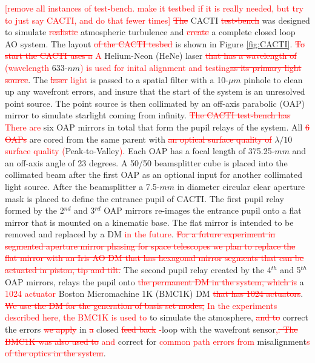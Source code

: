 \documentclass[12pt]{spieman}  %
\newcommand{\jrmadd}[1]{\textcolor{red}{#1}}
\newcommand{\jrmrmv}[1]{\textcolor{red}{\sout{#1}}}
\newcommand{\jrmcom}[1]{\textcolor{red}{[#1]}}
\begin{document}
\begin{spacing}{2}
\jrmcom{remove all instances of test-bench.  make it testbed if it is really needed, but try to just say CACTI, and do that fewer times}
\jrmrmv{The} CACTI \jrmrmv{test-bench} was designed to simulate \jrmrmv{realistic} atmospheric turbulence and \jrmrmv{create} a complete closed loop AO system. The layout \jrmrmv{of the CACTI tesbed} is shown in Figure \ref{fig:CACTI}. \jrmrmv{To start the CACTI uses a} \jrmadd{A} Helium-Neon (HeNe) laser \jrmrmv{that has a wavelength of} \jrmadd{(wavelength }633-$nm$\jrmadd{)} \jrmadd{is used for inital alignment and testing}\jrmrmv{as its primary light source}.  The \jrmrmv{laser} \jrmadd{light} is passed to a spatial filter with a 10-$\mu m$ pinhole to clean up any wavefront errors, and insure that the start of the system is an unresolved point source. The point source is then collimated by an off-axis parabolic (OAP) mirror to simulate starlight coming from infinity. \jrmrmv{The CACTI test-bench has} \jrmadd{There are} six OAP mirrors in total that form the pupil relays of the system. All \jrmrmv{6 OAPs} are cored from the same parent with \jrmrmv{an optical surface quality of} $\lambda /10$ \jrmadd{surface quality} \jrmadd{(}Peak-to-Valley\jrmadd{)}. Each OAP has a focal length of 375.25-$mm$ and an off-axis angle of 23 degrees. A 50/50 beamsplitter cube is placed into the collimated beam after the first OAP as an optional input for another collimated light source. After the beamsplitter a 7.5-$mm$ in diameter circular clear aperture mask is placed to define the entrance pupil of CACTI. The first pupil relay formed by the 2$^{nd}$ and 3$^{rd}$ OAP mirrors re-images the entrance pupil onto a flat mirror that is mounted on a kinematic base. The flat mirror is intended to be removed and replaced by a DM \jrmadd{in the future}. \jrmrmv{For a future experiment in segmented aperture mirror phasing for space telescopes we plan to replace the flat mirror with an Iris AO DM that has hexagonal mirror segments that can be actuated in piston, tip and tilt.} The second pupil relay created by the 4$^{th}$ and 5$^{th}$ OAP mirrors, relays the pupil onto \jrmrmv{the permanent DM in the system, which is} a \jrmadd{1024 actuator} Boston Micromachine 1K (BMC1K) DM\jrmrmv{ that has 1024 actuators}. \jrmrmv{We use the DM for the generation of basis set modes,} \jrmadd{In the experiments described here, the BMC1K is used to} to simulate the atmosphere, \jrmrmv{and to} correct the errors \jrmrmv{we apply} in \jrmrmv{a} closed \jrmrmv{feed back} \jrmadd{-}loop with the wavefront sensor\jrmadd{,}\jrmrmv{. The BMC1K was also used to} \jrmadd{and} correct for \jrmadd{common path errors from} misalignment\jrmadd{s}\jrmrmv{ of the optics in the system}. 


\end{spacing}
\end{document}
